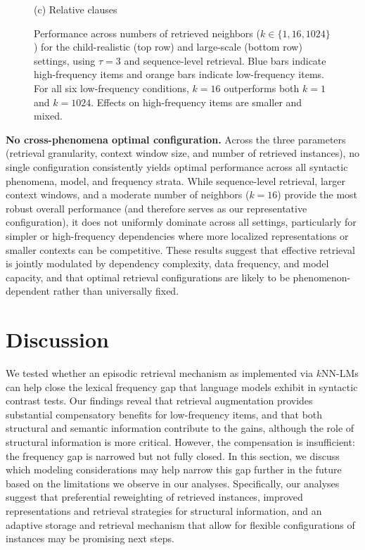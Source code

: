 \begin{figure}[ht]
\begin{minipage}[t]{0.32\textwidth}
        (c) Relative clauses
    \end{minipage}

    \caption{
        Performance across numbers of retrieved neighbors
        ($k\in\{1,16,1024\}$) for the child-realistic (top row) and large-scale (bottom row) settings, using $\tau=3$ and sequence-level retrieval. Blue bars indicate high-frequency items and orange bars indicate low-frequency items. For all six low-frequency conditions, $k=16$ outperforms both $k=1$ and $k=1024$. Effects on high-frequency items are smaller and mixed.
    }
    \label{fig:neighbor_effects}
\end{figure}

\noindent \textbf{No cross-phenomena optimal configuration.} 
Across the three parameters (retrieval granularity, context window size, and number of retrieved instances), no single configuration consistently yields optimal performance across all syntactic phenomena, model, and frequency strata. While sequence-level retrieval, larger context windows, and a moderate number of neighbors ($k=16$) provide the most robust overall performance (and therefore serves as our representative configuration), it does not uniformly dominate across all settings, particularly for simpler or high-frequency dependencies where more localized representations or smaller contexts can be competitive. These results suggest that effective retrieval is jointly modulated by dependency complexity, data frequency, and model capacity, and that optimal retrieval configurations are likely to be phenomenon-dependent rather than universally fixed.








\section{Discussion}

We tested whether an episodic retrieval mechanism as implemented via $k$NN-LMs can help close the lexical frequency gap that language models exhibit in syntactic contrast tests. Our findings reveal that retrieval augmentation provides substantial compensatory benefits for low-frequency items, and that both structural and semantic information contribute to the gains, although the role of structural information is more critical. However, the compensation is insufficient: the frequency gap is narrowed but not fully closed. In this section, we discuss which modeling considerations may help narrow this gap further in the future based on the limitations we observe in our analyses. Specifically, our analyses suggest that preferential reweighting of retrieved instances, improved representations and retrieval strategies for structural information, and an adaptive storage and retrieval mechanism that allow for flexible configurations of instances may be promising next steps.

